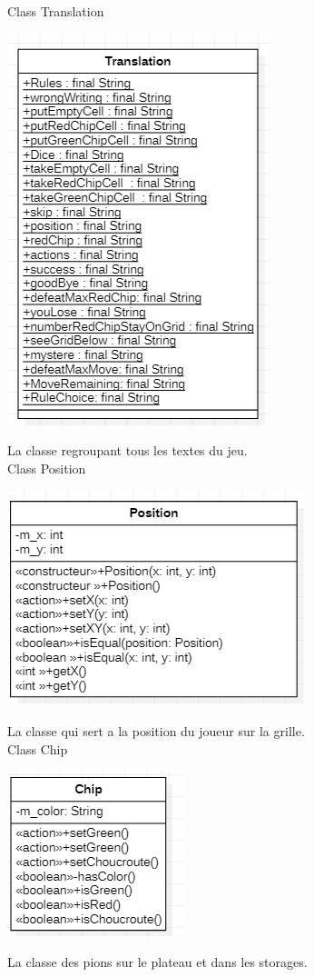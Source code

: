 Class Translation
\begin{center}
\includegraphics{Translation.png}
\end{center}
La classe regroupant tous les textes du jeu. \\

Class Position
\begin{center}
\includegraphics{Position.png}
\end{center}
La classe qui sert a la position du joueur sur la grille. \\

Class Chip
\begin{center}
\includegraphics{Chip.png}
\end{center}
La classe des pions sur le plateau et dans les storages.

